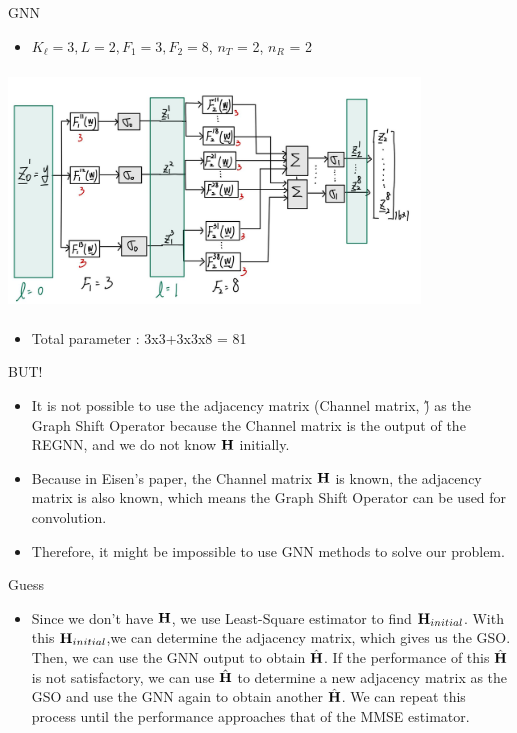 \documentclass[hyperref={bookmarks=false}]{beamer}
\numberwithin{figure}{section}
\begin{document}
\begin{frame}{GNN}
\begin{itemize}
    \item $K_{\ell} = 3, L = 2, F_{1} = 3, F_{2} = 8$, $n_{T}$ = 2, $n_{R}$ = 2
\end{itemize}
\includegraphics[width=4.3in,height=2.5in]{figures/REGNN_V2.jpg}
\begin{itemize}
    \item Total parameter : 3x3+3x3x8 = 81
\end{itemize}
\end{frame}
\begin{frame}{BUT!}
\begin{itemize}
    \item It is not possible to use the adjacency matrix (Channel matrix, \H) as the Graph Shift Operator because the Channel matrix is the output of the REGNN, and we do not know ${\bf H}$ initially.
    \item Because in Eisen's paper, the Channel matrix ${\bf H}$ is known, the adjacency matrix is also known, which means the Graph Shift Operator can be used for convolution.
    \item Therefore, it might be impossible to use GNN methods to solve our problem.
\end{itemize}
\end{frame}
\begin{frame}{Guess}
\begin{itemize}
    \item Since we don't have ${\bf H}$, we use Least-Square estimator to find ${\bf H}_{initial}$. With this ${\bf H}_{initial}$,we can determine the adjacency matrix, which gives us the GSO. Then, we can use the GNN output to obtain $\hat{{\bf H}}$. If the performance of this $\hat{{\bf H}}$ is not satisfactory, we can use $\hat{{\bf H}}$ to determine a new adjacency matrix as the GSO and use the GNN again to obtain another $\hat{{\bf H}}$. We can repeat this process until the performance approaches that of the MMSE estimator.
\end{itemize}
\end{frame}
\end{document}
